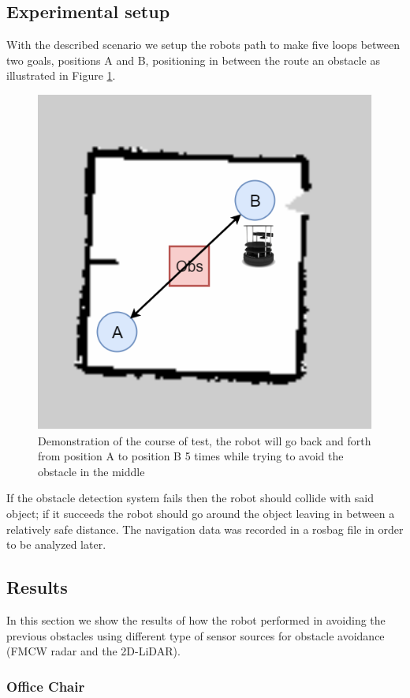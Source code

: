 \subsection{Experimental setup}
With the described scenario we setup the robots path to make five loops between two goals, positions A and B, positioning in between the route an obstacle as illustrated in  Figure \ref{fig:exp}. 
\begin{figure}[ht!]
\centerline{\includegraphics [width=0.5 \textwidth]{imgs/chapter5/exp5.png}}
\caption[Demonstration of the course of test]{Demonstration of the course of test, the robot will go back and forth from position A to position B 5 times while  trying to avoid the obstacle in the middle}
\label{fig:exp}
\end{figure}

If the obstacle detection system fails then the robot should collide with said object; if it succeeds the robot should go around the object leaving in between a relatively safe distance. 
The  navigation data was recorded in a rosbag file in order to be analyzed later.



\subsection{Results}
In this section we show the results of how the robot performed in avoiding the previous obstacles using different type of sensor sources for obstacle avoidance (\ac{FMCW} radar and the 2D-\ac{LiDAR}).

\subsubsection{Office Chair}

